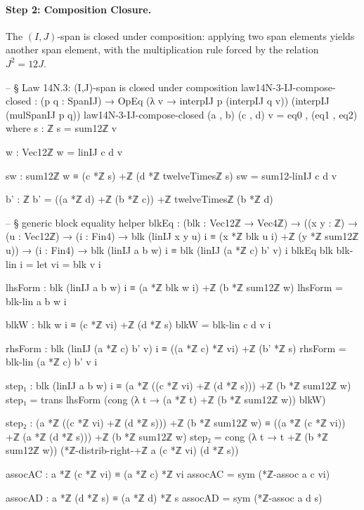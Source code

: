 \documentclass[11pt,a4paper]{book}
\begin{document}
\paragraph{Step 2: Composition Closure.}
The $(I,J)$-span is closed under composition: applying two
span elements yields another span element, with the multiplication
rule forced by the relation $J^2 = 12J$.

\begin{code}
-- § Law 14N.3: (I,J)-span is closed under composition
law14N-3-IJ-compose-closed : (p q : SpanIJ) → OpEq (λ v → interpIJ p (interpIJ q v)) (interpIJ (mulSpanIJ p q))
law14N-3-IJ-compose-closed (a , b) (c , d) v = eq0 , (eq1 , eq2)
  where
    s : ℤ
    s = sum12ℤ v

    w : Vec12ℤ
    w = linIJ c d v

    sw : sum12ℤ w ≡ (c *ℤ s) +ℤ (d *ℤ twelveTimesℤ s)
    sw = sum12-linIJ c d v

    b' : ℤ
    b' = ((a *ℤ d) +ℤ (b *ℤ c)) +ℤ twelveTimesℤ (b *ℤ d)

    -- § generic block equality helper
    blkEq :
      (blk : Vec12ℤ → Vec4ℤ) →
      ((x y : ℤ) → (u : Vec12ℤ) → (i : Fin4) → blk (linIJ x y u) i ≡ (x *ℤ blk u i) +ℤ (y *ℤ sum12ℤ u)) →
      (i : Fin4) →
      blk (linIJ a b w) i ≡ blk (linIJ (a *ℤ c) b' v) i
    blkEq blk blk-lin i =
      let
        vi = blk v i

        lhsForm : blk (linIJ a b w) i ≡ (a *ℤ blk w i) +ℤ (b *ℤ sum12ℤ w)
        lhsForm = blk-lin a b w i

        blkW : blk w i ≡ (c *ℤ vi) +ℤ (d *ℤ s)
        blkW = blk-lin c d v i

        rhsForm : blk (linIJ (a *ℤ c) b' v) i ≡ ((a *ℤ c) *ℤ vi) +ℤ (b' *ℤ s)
        rhsForm = blk-lin (a *ℤ c) b' v i

        step₁ : blk (linIJ a b w) i ≡ (a *ℤ ((c *ℤ vi) +ℤ (d *ℤ s))) +ℤ (b *ℤ sum12ℤ w)
        step₁ =
          trans
            lhsForm
            (cong (λ t → (a *ℤ t) +ℤ (b *ℤ sum12ℤ w)) blkW)

        step₂ : (a *ℤ ((c *ℤ vi) +ℤ (d *ℤ s))) +ℤ (b *ℤ sum12ℤ w)
                  ≡ ((a *ℤ (c *ℤ vi)) +ℤ (a *ℤ (d *ℤ s))) +ℤ (b *ℤ sum12ℤ w)
        step₂ = cong (λ t → t +ℤ (b *ℤ sum12ℤ w)) (*ℤ-distrib-right-+ℤ a (c *ℤ vi) (d *ℤ s))

        assocAC : a *ℤ (c *ℤ vi) ≡ (a *ℤ c) *ℤ vi
        assocAC = sym (*ℤ-assoc a c vi)

        assocAD : a *ℤ (d *ℤ s) ≡ (a *ℤ d) *ℤ s
        assocAD = sym (*ℤ-assoc a d s)


\end{code}
\end{document}
